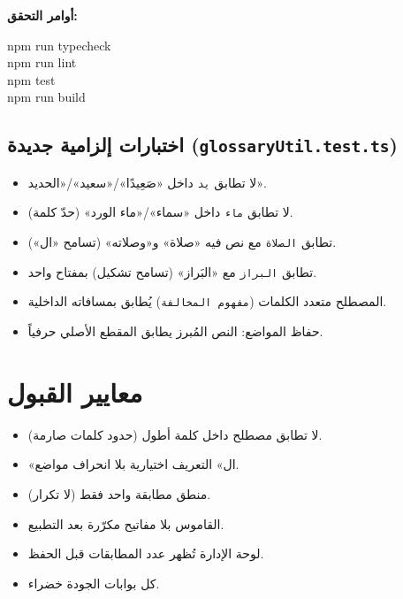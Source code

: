 \documentclass[11pt]{article}
\begin{document}
\vspace{6pt}
\textbf{أوامر التحقق:}
\begin{codebox}
{\ttfamily\small\raggedleft
npm run typecheck\\
npm run lint\\
npm test\\
npm run build
}
\end{codebox}

\subsection*{اختبارات إلزامية جديدة (\texttt{glossaryUtil.test.ts})}
\begin{itemize}
  \item لا تطابق \texttt{يد} داخل «صَعِيدًا»/«سعيد»/«الحديد».
  \item لا تطابق \texttt{ماء} داخل «سماء»/«ماء الورد» (حدّ كلمة).
  \item تطابق \texttt{الصلاة} مع نص فيه «صلاة» و«وصلاته» (تسامح «ال»).
  \item تطابق \texttt{البراز} مع «البَراز» (تسامح تشكيل) بمفتاح واحد.
  \item المصطلح متعدد الكلمات (\texttt{مفهوم المخالفة}) يُطابق بمسافاته الداخلية.
  \item حفاظ المواضع: النص المُبرز يطابق المقطع الأصلي حرفياً.
\end{itemize}

\section{معايير القبول}

\begin{itemize}
  \item[${\color{okgreen}\faCheckCircle}$] لا تطابق مصطلح داخل كلمة أطول (حدود كلمات صارمة).
  \item[${\color{okgreen}\faCheckCircle}$] «ال» التعريف اختيارية بلا انحراف مواضع.
  \item[${\color{okgreen}\faCheckCircle}$] منطق مطابقة واحد فقط (لا تكرار).
  \item[${\color{okgreen}\faCheckCircle}$] القاموس بلا مفاتيح مكرّرة بعد التطبيع.
  \item[${\color{okgreen}\faCheckCircle}$] لوحة الإدارة تُظهر عدد المطابقات قبل الحفظ.
  \item[${\color{okgreen}\faCheckCircle}$] كل بوابات الجودة خضراء.
\end{itemize}
\end{document}
